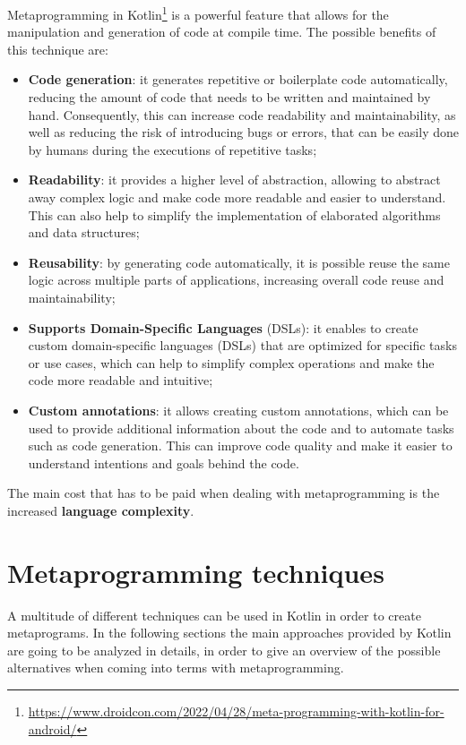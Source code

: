 Metaprogramming in Kotlin\footnote{\url{https://www.droidcon.com/2022/04/28/meta-programming-with-kotlin-for-android/}} is a powerful feature that allows for the manipulation and generation of code at compile time. The possible benefits of this technique are:
\begin{itemize}
    \item \textbf{Code generation}: it generates repetitive or boilerplate code automatically, reducing the amount of code that needs to be written and maintained by hand. Consequently, this can increase code readability and maintainability, as well as reducing the risk of introducing bugs or errors, that can be easily done by humans during the executions of repetitive tasks;
    \item \textbf{Readability}: it provides a higher level of abstraction, allowing to abstract away complex logic and make code more readable and easier to understand. This can also help to simplify the implementation of elaborated algorithms and data structures;
    \item \textbf{Reusability}: by generating code automatically, it is possible reuse the same logic across multiple parts of applications, increasing overall code reuse and maintainability;
    \item \textbf{Supports Domain-Specific Languages} (DSLs): it enables to create custom domain-specific languages (DSLs) that are optimized for specific tasks or use cases, which can help to simplify complex operations and make the code more readable and intuitive;
    \item \textbf{Custom annotations}: it allows creating custom annotations, which can be used to provide additional information about the code and to automate tasks such as code generation. This can improve code quality and make it easier to understand intentions and goals behind the code.
\end{itemize}

The main cost that has to be paid when dealing with metaprogramming is the increased \textbf{language complexity}.

\section{Metaprogramming techniques}
A multitude of different techniques can be used in Kotlin in order to create metaprograms. In the following sections the main approaches provided by Kotlin are going to be analyzed in details, in order to give an overview of the possible alternatives when coming into terms with metaprogramming.

